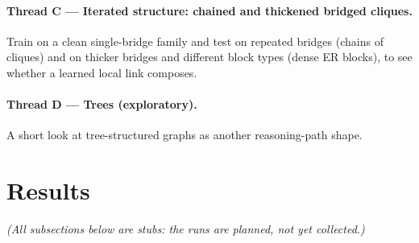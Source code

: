 \documentclass[11pt,a4paper]{article}
\begin{document}
\paragraph{Thread C --- Iterated structure: chained and thickened bridged cliques.} Train on a clean
single-bridge family and test on repeated bridges (chains of cliques) and on thicker bridges and
different block types (dense ER blocks), to see whether a learned local link composes.

\paragraph{Thread D --- Trees (exploratory).} A short look at tree-structured graphs as another
reasoning-path shape.

\section{Results}
\label{sec:results}

\emph{(All subsections below are stubs: the runs are planned, not yet collected.)}
\end{document}
